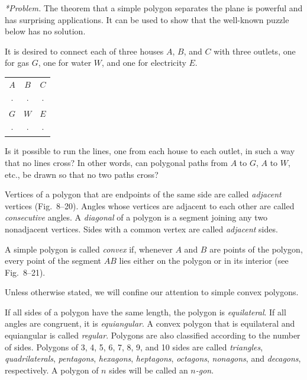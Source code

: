 \documentclass[11pt]{book}
\makeatletter
\theoremstyle{bkplain}
\newcommand{\VIIIutilities}{%
  \par\medskip\begin{center}
  \begin{tabular}{@{}c@{\hspace{3.2em}}c@{\hspace{3.2em}}c@{}}
    $A$ & $B$ & $C$ \\[-1pt]
    $\cdot$ & $\cdot$ & $\cdot$ \\[4pt]
    $G$ & $W$ & $E$ \\[-1pt]
    $\cdot$ & $\cdot$ & $\cdot$ \\
  \end{tabular}
  \end{center}\par\medskip}
\theoremstyle{XIplainnote}
\theoremstyle{bkplain}
\theoremstyle{bkplain}
\makeatother
\begin{document}
\emph{*Problem.} The theorem that a simple polygon separates the plane is
powerful and has surprising applications. It can be used to show that the
well-known puzzle below has no solution.

It is desired to connect each of three houses $A$, $B$, and $C$ with three
outlets, one for gas $G$, one for water $W$, and one for electricity $E$.

\VIIIutilities

Is it possible to run the lines, one from each house to each outlet, in such a
way that no lines cross? In other words, can polygonal paths from $A$ to $G$,
$A$ to $W$, etc., be drawn so that no two paths cross?

\begin{definition}
Vertices of a polygon that are endpoints of the same side are called
\emph{adjacent} vertices (Fig.~8--20). Angles whose vertices are adjacent to
each other are called \emph{consecutive} angles. A \emph{diagonal} of a
polygon is a segment joining any two nonadjacent vertices. Sides with a common
vertex are called \emph{adjacent} sides.
\end{definition}

\FIGVIIITWENTY

\begin{definition}
A simple polygon is called \emph{convex} if, whenever $A$ and $B$ are points
of the polygon, every point of the segment $AB$ lies either on the polygon or
in its interior (see Fig.~8--21).
\end{definition}

\FIGVIIITWENTYONE

\begin{remark}
Unless otherwise stated, we will confine our attention to simple convex
polygons.
\end{remark}

\begin{definition}
If all sides of a polygon have the same length, the polygon is
\emph{equilateral}. If all angles are congruent, it is \emph{equiangular}. A
convex polygon that is equilateral and equiangular is called \emph{regular}.
Polygons are also classified according to the number of sides. Polygons of 3,
4, 5, 6, 7, 8, 9, and 10 sides are called \emph{triangles},
\emph{quadrilaterals}, \emph{pentagons}, \emph{hexagons}, \emph{heptagons},
\emph{octagons}, \emph{nonagons}, and \emph{decagons}, respectively. A polygon
of $n$ sides will be called an \emph{$n$-gon}.
\end{definition}
\end{document}
